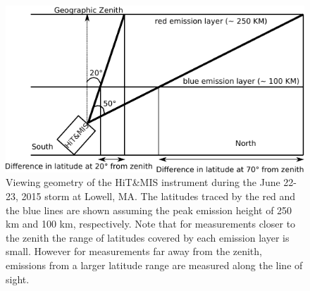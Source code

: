 \begin{figure}[hp]
	\centering\includegraphics[width=40pc]{elayer.pdf}
	\caption{Viewing geometry of the HiT\&MIS instrument during the June 22-23, 2015 storm at Lowell, MA. The latitudes traced by the red and the blue lines are shown assuming the peak emission height of
		250 km and 100 km, respectively. Note that for measurements closer to the zenith the range of latitudes covered by each emission layer is small. However for measurements far away from the zenith, emissions from a larger latitude range are measured along the line of sight.}
	\label{fig:elayer}
\end{figure}
